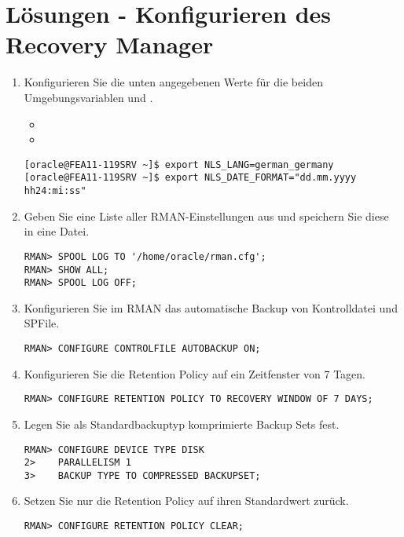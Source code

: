 \section{Lösungen - Konfigurieren des Recovery Manager}
  \begin{enumerate}
    \item Konfigurieren Sie die unten angegebenen Werte für die beiden Umgebungsvariablen  und .
      \begin{itemize}
        \item {}
        \item {}
      \end{itemize}
      \begin{lstlisting}[language=terminal]
[oracle@FEA11-119SRV ~]$ export NLS_LANG=german_germany
[oracle@FEA11-119SRV ~]$ export NLS_DATE_FORMAT="dd.mm.yyyy hh24:mi:ss"
      \end{lstlisting}
    \item Geben Sie eine Liste aller RMAN-Einstellungen aus und speichern Sie diese in eine Datei.
      \begin{lstlisting}[language=rman]
RMAN> SPOOL LOG TO '/home/oracle/rman.cfg';
RMAN> SHOW ALL;
RMAN> SPOOL LOG OFF;
      \end{lstlisting}
    \item Konfigurieren Sie im RMAN das automatische Backup von Kontrolldatei und SPFile.
      \begin{lstlisting}[language=rman]
RMAN> CONFIGURE CONTROLFILE AUTOBACKUP ON;
      \end{lstlisting}
    \item Konfigurieren Sie die Retention Policy auf ein Zeitfenster von 7 Tagen.
      \begin{lstlisting}[language=rman]
RMAN> CONFIGURE RETENTION POLICY TO RECOVERY WINDOW OF 7 DAYS;
      \end{lstlisting}
    \item Legen Sie als Standardbackuptyp komprimierte Backup Sets fest.
      \begin{lstlisting}[language=rman]
RMAN> CONFIGURE DEVICE TYPE DISK
2>    PARALLELISM 1
3>    BACKUP TYPE TO COMPRESSED BACKUPSET;
      \end{lstlisting}
    \item Setzen Sie nur die Retention Policy auf ihren Standardwert zurück.
      \begin{lstlisting}[language=rman]
RMAN> CONFIGURE RETENTION POLICY CLEAR;
      \end{lstlisting}
  \end{enumerate}
